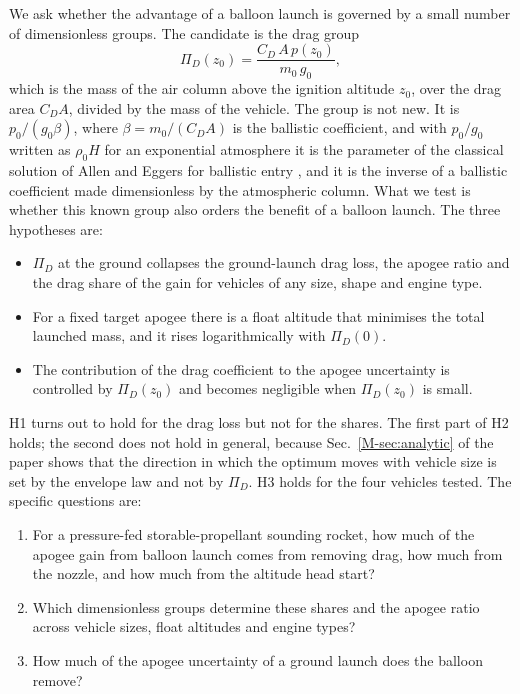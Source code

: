 \documentclass[11pt,a4paper]{article}
\begin{document}
We ask whether the advantage of a balloon launch is governed by a small number of dimensionless groups. The candidate is the drag group
\begin{equation}
\Pi_D(z_0)=\frac{C_D\,A\,p(z_0)}{m_0\,g_0},
\label{eq:pid}
\end{equation}
which is the mass of the air column above the ignition altitude $z_0$, over the drag area $C_DA$, divided by the mass of the vehicle. The group is not new. It is $p_0/(g_0\beta)$, where $\beta=m_0/(C_DA)$ is the ballistic coefficient, and with $p_0/g_0$ written as $\rho_0H$ for an exponential atmosphere it is the parameter of the classical solution of Allen and Eggers for ballistic entry \cite{allen1958}, and it is the inverse of a ballistic coefficient made dimensionless by the atmospheric column. What we test is whether this known group also orders the benefit of a balloon launch. The three hypotheses are:
\begin{itemize}
\item[H1.] $\Pi_D$ at the ground collapses the ground-launch drag loss, the apogee ratio and the drag share of the gain for vehicles of any size, shape and engine type.
\item[H2.] For a fixed target apogee there is a float altitude that minimises the total launched mass, and it rises logarithmically with $\Pi_D(0)$.
\item[H3.] The contribution of the drag coefficient to the apogee uncertainty is controlled by $\Pi_D(z_0)$ and becomes negligible when $\Pi_D(z_0)$ is small.
\end{itemize}
H1 turns out to hold for the drag loss but not for the shares. The first part of H2 holds; the second does not hold in general, because Sec.~\ref{M-sec:analytic} of the paper shows that the direction in which the optimum moves with vehicle size is set by the envelope law and not by $\Pi_D$. H3 holds for the four vehicles tested. The specific questions are:
\begin{enumerate}
\item For a pressure-fed storable-propellant sounding rocket, how much of the apogee gain from balloon launch comes from removing drag, how much from the nozzle, and how much from the altitude head start?
\item Which dimensionless groups determine these shares and the apogee ratio across vehicle sizes, float altitudes and engine types?
\item How much of the apogee uncertainty of a ground launch does the balloon remove?
\end{enumerate}
\end{document}
